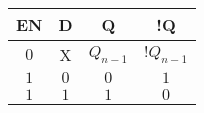 \begin{tabular}{cccc}
\hline
	EN & D & Q & !Q\\ 
\hline
	$0$ & X & $Q_{n-1}$ & $!Q_{n-1}$ \\
	$1$ & $0$ & $0$ & $1$ \\
	$1$ & $1$ & $1$ & $0$ \\
\hline
\end{tabular}
